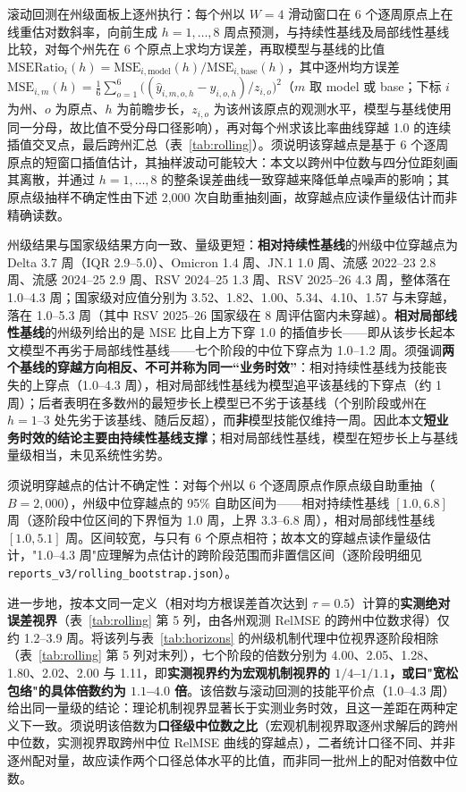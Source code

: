 \documentclass[10pt,a4paper]{article}
\theoremstyle{plain}
\theoremstyle{definition}
\begin{document}
滚动回测在州级面板上逐州执行：每个州以 $W=4$ 滑动窗口在 6 个逐周原点上在线重估对数斜率，向前生成 $h=1,\dots,8$ 周点预测，与持续性基线及局部线性基线比较，对每个州先在 6 个原点上求均方误差，再取模型与基线的比值 $\text{MSERatio}_{i}(h) = \text{MSE}_{i,\text{model}}(h)/\text{MSE}_{i,\text{base}}(h)$，其中逐州均方误差 $\text{MSE}_{i,m}(h) = \frac16\sum_{o=1}^{6}\big((\hat y_{i,m,o,h}-y_{i,o,h})/z_{i,o}\big)^2$（$m$ 取 model 或 base；下标 $i$ 为州、$o$ 为原点、$h$ 为前瞻步长，$z_{i,o}$ 为该州该原点的观测水平，模型与基线使用同一分母，故比值不受分母口径影响），再对每个州求该比率曲线穿越 1.0 的连续插值交叉点，最后跨州汇总（表~\ref{tab:rolling}）。须说明该穿越点是基于 6 个逐周原点的短窗口插值估计，其抽样波动可能较大：本文以跨州中位数与四分位距刻画其离散，并通过 $h=1,\dots,8$ 的整条误差曲线一致穿越来降低单点噪声的影响；其原点级抽样不确定性由下述 2,000 次自助重抽刻画，故穿越点应读作量级估计而非精确读数。

州级结果与国家级结果方向一致、量级更短：\textbf{相对持续性基线}的州级中位穿越点为 Delta 3.7 周（IQR 2.9--5.0）、Omicron 1.4 周、JN.1 1.0 周、流感 2022--23 2.8 周、流感 2024--25 2.9 周、RSV 2024--25 1.3 周、RSV 2025--26 4.3 周，整体落在 1.0--4.3 周；国家级对应值分别为 3.52、1.82、1.00、5.34、4.10、1.57 与未穿越，落在 1.0--5.3 周（其中 RSV 2025--26 国家级在 8 周评估窗内未穿越）。\textbf{相对局部线性基线}的州级列给出的是 MSE 比自上方下穿 1.0 的插值步长——即从该步长起本文模型不再劣于局部线性基线——七个阶段的中位下穿点为 1.0--1.2 周。须强调\textbf{两个基线的穿越方向相反、不可并称为同一“业务时效”}：相对持续性基线为技能丧失的上穿点（1.0--4.3 周），相对局部线性基线为模型追平该基线的下穿点（约 1 周）；后者表明在多数州的最短步长上模型已不劣于该基线（个别阶段或州在 $h=1$--$3$ 处先劣于该基线、随后反超），而\textbf{非}模型技能仅维持一周。因此本文\textbf{短业务时效的结论主要由持续性基线支撑}；相对局部线性基线，模型在短步长上与基线量级相当，未见系统性劣势。

须说明穿越点的估计不确定性：对每个州以 6 个逐周原点作原点级自助重抽（$B=2{,}000$），州级中位穿越点的 95\% 自助区间为——相对持续性基线 $[1.0, 6.8]$ 周（逐阶段中位区间的下界恒为 1.0 周，上界 3.3--6.8 周），相对局部线性基线 $[1.0, 5.1]$ 周。区间较宽，与只有 6 个原点相符；故本文的穿越点读作量级估计，"1.0--4.3 周"应理解为点估计的跨阶段范围而非置信区间（逐阶段明细见 \texttt{reports\_v3/rolling\_bootstrap.json}）。

进一步地，按本文同一定义（相对均方根误差首次达到 $\tau = 0.5$）计算的\textbf{实测绝对误差视界}（表~\ref{tab:rolling} 第 5 列，由各州观测 RelMSE 的跨州中位数求得）仅约 1.2--3.9 周。将该列与表~\ref{tab:horizons} 的州级机制代理中位视界逐阶段相除（表~\ref{tab:rolling} 第 5 列对末列），七个阶段的倍数分别为 4.00、2.05、1.28、1.80、2.02、2.00 与 1.11，即\textbf{实测视界约为宏观机制视界的 $1/4$--$1/1.1$，或曰"宽松包络"的具体倍数约为 $1.1$--$4.0$ 倍}。该倍数与滚动回测的技能平价点（1.0--4.3 周）给出同一量级的结论：理论机制视界显著长于实测业务时效，且这一差距在两种定义下一致。须说明该倍数为\textbf{口径级中位数之比}（宏观机制视界取逐州求解后的跨州中位数，实测视界取跨州中位 RelMSE 曲线的穿越点），二者统计口径不同、并非逐州配对量，故应读作两个口径总体水平的比值，而非同一批州上的配对倍数中位数。
\end{document}
